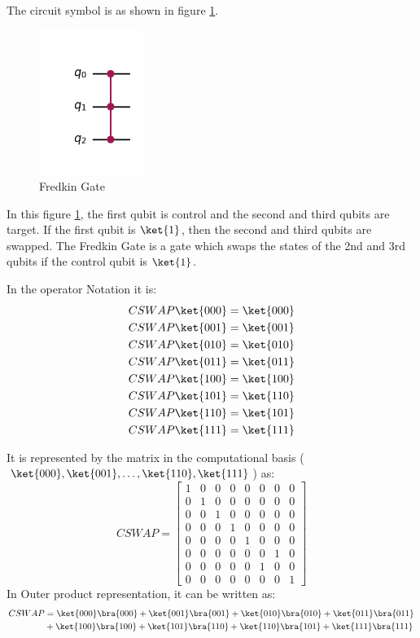 \documentclass[12pt, oneside]{book}
\theoremstyle{definition}
\theoremstyle{definition}
\theoremstyle{remark}
\begin{document}
The circuit symbol is as shown in figure \ref{fig:fredkin}.
\begin{figure}[H]
    \centering
    \includegraphics[width=0.3\textwidth]{../images/cswap-gate.png}
    \caption{Fredkin Gate}
    \label{fig:fredkin}
\end{figure}
In this figure \ref{fig:fredkin}, the first qubit is control and the second and third qubits are target.
If the first qubit is $\ket{1}$, then the second and third qubits are swapped. The Fredkin Gate
is a gate which swaps the states of the 2nd and 3rd qubits if the control qubit is $\ket{1}$.

In the operator Notation it is:
\begin{align*}
    CSWAP\ket{000}&=\ket{000} \\
    CSWAP\ket{001}&=\ket{001} \\
    CSWAP\ket{010}&=\ket{010} \\
    CSWAP\ket{011}&=\ket{011} \\
    CSWAP\ket{100}&=\ket{100} \\
    CSWAP\ket{101}&=\ket{110} \\
    CSWAP\ket{110}&=\ket{101} \\
    CSWAP\ket{111}&=\ket{111}
\end{align*}

It is represented by the matrix in the computational basis ($\ket{000},\ket{001},\ldots,\ket{110},\ket{111}$) as:
\[
    CSWAP=\begin{bmatrix}
        1 & 0 & 0 & 0 & 0 & 0 & 0 & 0 \\
        0 & 1 & 0 & 0 & 0 & 0 & 0 & 0 \\
        0 & 0 & 1 & 0 & 0 & 0 & 0 & 0 \\
        0 & 0 & 0 & 1 & 0 & 0 & 0 & 0 \\
        0 & 0 & 0 & 0 & 1 & 0 & 0 & 0 \\
        0 & 0 & 0 & 0 & 0 & 0 & 1 & 0 \\
        0 & 0 & 0 & 0 & 0 & 1 & 0 & 0 \\
        0 & 0 & 0 & 0 & 0 & 0 & 0 & 1
    \end{bmatrix}
\]
In Outer product representation, it can be written as:
\begin{align*}
    CSWAP&=\ket{000}\bra{000}+\ket{001}\bra{001}+\ket{010}\bra{010}+\ket{011}\bra{011} \\
    &+\ket{100}\bra{100}+\ket{101}\bra{110}+\ket{110}\bra{101}+\ket{111}\bra{111}
\end{align*}
\end{document}
